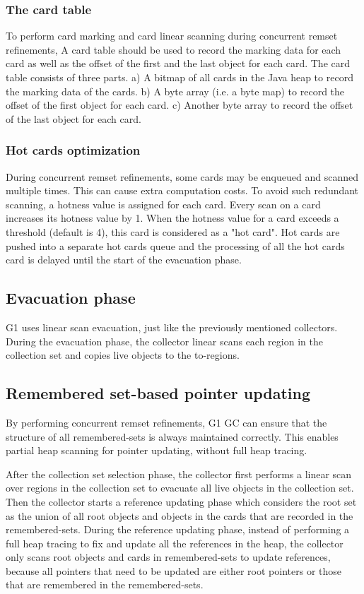 \subsubsection{The card table}

To perform card marking and card linear scanning during concurrent remset refinements,
A card table should be used to record the marking data for each card as well as the offset
of the first and the last object for each card.
The card table consists of three parts. a) A bitmap of all cards in the Java heap
to record the marking data of the cards. b) A byte array (i.e. a byte map) to record the
offset of the first object for each card. c) Another byte array to record the
offset of the last object for each card.

\subsubsection{Hot cards optimization}

During concurrent remset refinements, some cards may be enqueued and scanned multiple times.
This can cause extra computation costs. To avoid such redundant scanning,
a hotness value is assigned for each card. Every scan on a card increases its hotness value by 1.
When the hotness value for a card exceeds a threshold (default is 4), this card is considered
as a "hot card". Hot cards are pushed into a separate hot cards queue and the processing
of all the hot cards card is delayed until the start of the evacuation phase.

\subsection{Evacuation phase}

G1 uses linear scan evacuation, just like the previously mentioned collectors.
During the evacuation phase, the collector linear scans each region in the collection
set and copies live objects to the to-regions.

\subsection{Remembered set-based pointer updating}

By performing concurrent remset refinements, G1 GC can ensure that the structure of all remembered-sets is always maintained correctly.
This enables partial heap scanning for pointer updating, without full heap tracing.

After the collection set selection phase, the collector first performs a linear
scan over regions in the collection set to evacuate all live objects in the collection set.
Then the collector starts a reference updating phase which considers
the root set as the union of all root objects and objects in the cards that are recorded in the remembered-sets.
During the reference updating phase, instead of performing a full heap tracing to fix and
update all the references in the heap, the collector only scans root objects and
cards in remembered-sets to update references,
because all pointers that need to be updated are either root pointers or those that are remembered in the remembered-sets.

